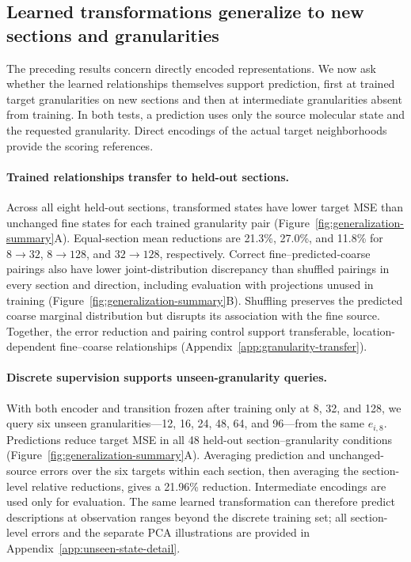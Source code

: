 \subsection{Learned transformations generalize to new sections and granularities}
\label{sec:granularity-transfer}
\label{sec:scale-continuum}

The preceding results concern directly encoded representations. We now ask whether the learned relationships themselves support prediction, first at trained target granularities on new sections and then at intermediate granularities absent from training. In both tests, a prediction uses only the source molecular state and the requested granularity. Direct encodings of the actual target neighborhoods provide the scoring references.

\paragraph{Trained relationships transfer to held-out sections.}
Across all eight held-out sections, transformed states have lower target MSE than unchanged fine states for each trained granularity pair (Figure~\ref{fig:generalization-summary}A). Equal-section mean reductions are 21.3\%, 27.0\%, and 11.8\% for $8\to32$, $8\to128$, and $32\to128$, respectively. Correct fine--predicted-coarse pairings also have lower joint-distribution discrepancy than shuffled pairings in every section and direction, including evaluation with projections unused in training (Figure~\ref{fig:generalization-summary}B). Shuffling preserves the predicted coarse marginal distribution but disrupts its association with the fine source. Together, the error reduction and pairing control support transferable, location-dependent fine--coarse relationships (Appendix~\ref{app:granularity-transfer}).

\paragraph{Discrete supervision supports unseen-granularity queries.}
With both encoder and transition frozen after training only at 8, 32, and 128, we query six unseen granularities---12, 16, 24, 48, 64, and 96---from the same $e_{i,8}$. Predictions reduce target MSE in all 48 held-out section--granularity conditions (Figure~\ref{fig:generalization-summary}A). Averaging prediction and unchanged-source errors over the six targets within each section, then averaging the section-level relative reductions, gives a 21.96\% reduction. Intermediate encodings are used only for evaluation. The same learned transformation can therefore predict descriptions at observation ranges beyond the discrete training set; all section-level errors and the separate PCA illustrations are provided in Appendix~\ref{app:unseen-state-detail}.

